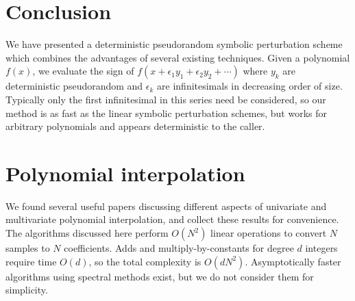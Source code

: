 \documentclass[11pt]{article}
\begin{document}
\section{Conclusion}

We have presented a deterministic pseudorandom symbolic perturbation scheme which combines the advantages of several existing techniques.  Given a polynomial $f(x)$, we evaluate
the sign of $f(x + \epsilon_1 y_1 + \epsilon_2 y_2 + \cdots)$ where $y_k$ are deterministic pseudorandom and $\epsilon_k$ are infinitesimals in decreasing order of size.
Typically only the first infinitesimal in this series need be considered, so our method is as fast as the linear symbolic perturbation schemes, but works for arbitrary
polynomials and appears deterministic to the caller.



\appendix

\section{Polynomial interpolation} \label{polynomial}

We found several useful papers discussing different aspects of univariate and multivariate polynomial interpolation, and collect these results for convenience.  The algorithms
discussed here perform $O(N^2)$ linear operations to convert $N$ samples to $N$ coefficients.  Adds and multiply-by-constants for degree $d$ integers require time $O(d)$, so
the total complexity is $O(d N^2)$.  Asymptotically faster algorithms using spectral methods exist, but we do not consider them for simplicity.
\end{document}
